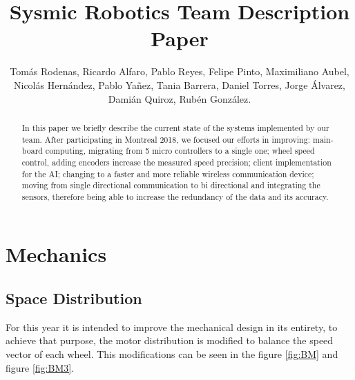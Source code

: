 \documentclass{llncs}
\begin{document}
\tracingall
\mainmatter

\title{Sysmic Robotics Team Description Paper}

\author{Tom\'as Rodenas, Ricardo Alfaro,  Pablo Reyes, Felipe Pinto, Maximiliano Aubel, Nicolás Hernández, Pablo Yañez, Tania Barrera, Daniel Torres, Jorge Álvarez, Damián Quiroz, Rubén González.}
%
%

\maketitle

\begin{abstract}
    In this paper we briefly describe the current state of the systems implemented by our team. After participating in Montreal 2018, we focused our efforts in improving: main-board computing, migrating from 5 micro controllers to a single one; wheel speed control, adding encoders increase the measured speed precision; client implementation for the AI; changing to a faster and more reliable wireless communication device; moving from single directional communication to bi directional and integrating the sensors, therefore being able to increase the redundancy of the data and its accuracy.
\end{abstract}


\section{Mechanics}

\subsection{Space Distribution}
For this year it is intended to improve the mechanical design in its entirety, to achieve that purpose, the motor distribution is modified to balance the speed vector of each wheel. This modifications can be seen in the figure \ref{fig:BM} and figure \ref{fig:BM3}.
\end{document}
